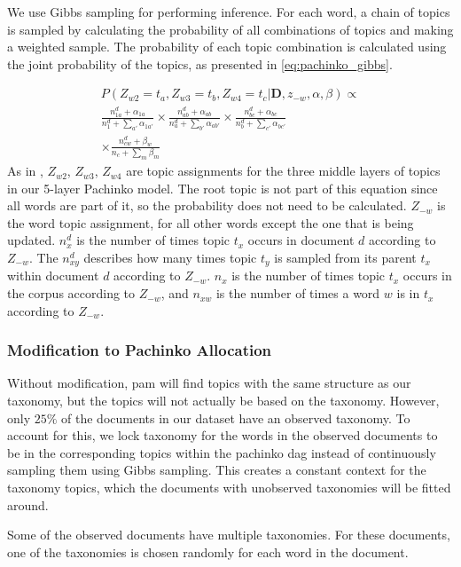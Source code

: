 We use Gibbs sampling for performing inference.
For each word, a chain of topics is sampled by calculating the probability of all combinations of topics and making a weighted sample.
The probability of each topic combination is calculated using the joint probability of the topics, as presented in \autoref{eq:pachinko_gibbs}.

\begin{equation}\label{eq:pachinko_gibbs}
	\begin{split}
		P(Z_{w2} = t_a, Z_{w3} = t_b, Z_{w4} = t_c | \textbf{D}, z_{-w}, \alpha, \beta) \propto \\
		\frac{n_{1a}^d + \alpha_{1a}}{n_1^d + \sum_{a'} \alpha_{1a'}} \times
		\frac{n_{ab}^d + \alpha_{ab}}{n_a^d + \sum_{b'} \alpha_{ab'}}  \times 
		\frac{n_{bc}^d + \alpha_{bc}}{n_{b}^d + \sum_{c'} \alpha_{bc'}} \\ \times 
		\frac{n_{cw}^d + \beta_{w}}{n_{c} + \sum_{m} \beta_{m}} 
	\end{split}
\end{equation}
As in \citet{li2006pachinko}, $Z_{w2}$, $Z_{w3}$, $Z_{w4}$ are topic assignments for the three middle layers of topics in our 5-layer Pachinko model.
The root topic is not part of this equation since all words are part of it, so the probability does not need to be calculated.
$Z_{-w}$ is the word topic assignment, for all other words except the one that is being updated.
$n_x^d$ is the number of times topic $t_x$ occurs in document $d$ according to $Z_{-w}$. 
The $n_{xy}^d$ describes how many times topic $t_y$ is sampled from its parent $t_x$ within document $d$ according to $Z_{-w}$.
$n_x$ is the number of times topic $t_x$ occurs in the corpus according to $Z_{-w}$, and $n_{xw}$ is the number of times a word $w$ is in $t_x$ according to $Z_{-w}$.





\subsubsection{Modification to Pachinko Allocation}\label{subsec:mod_pachinko}
Without modification, \gls{pam} will find topics with the same structure as our taxonomy, but the topics will not actually be based on the taxonomy.
However, only $25\%$ of the documents in our dataset have an observed taxonomy.
To account for this, we lock taxonomy for the words in the observed documents to be in the corresponding topics within the pachinko \gls{dag} instead of continuously sampling them using Gibbs sampling.
This creates a constant context for the taxonomy topics, which the documents with unobserved taxonomies will be fitted around.

Some of the observed documents have multiple taxonomies.
For these documents, one of the taxonomies is chosen randomly for each word in the document.
